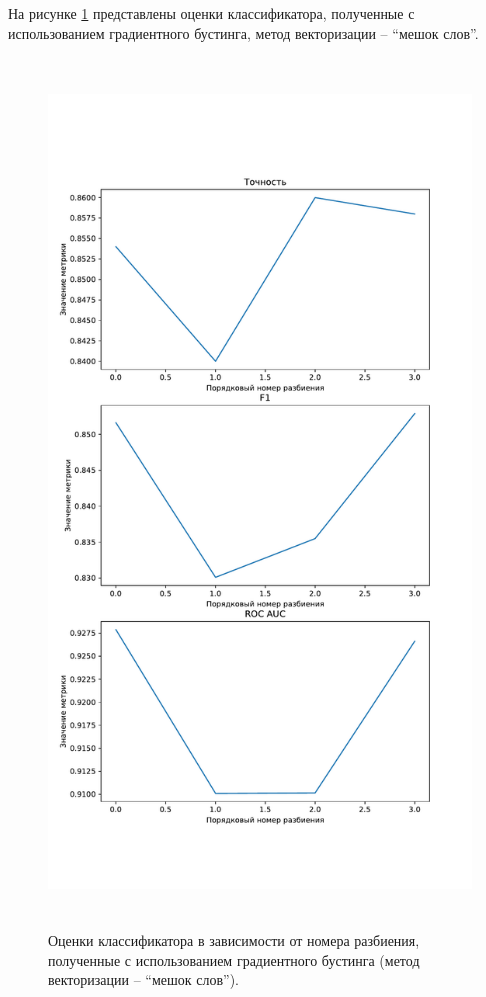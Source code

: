 На рисунке \ref{img:gradientMetricsBag} представлены оценки классификатора, полученные с использованием градиентного бустинга, метод векторизации -- ``мешок слов''.
\begin{figure}[H]
	\centering
	\includegraphics[height=23cm]{inc/plots/gradientMetricsBag.pdf}
	\caption{ Оценки классификатора в зависимости от номера разбиения, полученные с использованием градиентного бустинга (метод векторизации --  ``мешок слов''). }
	\label{img:gradientMetricsBag}
\end{figure}

